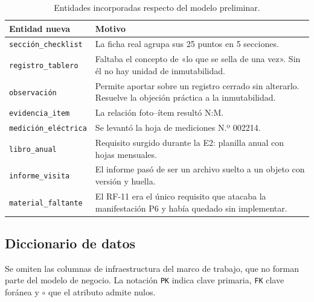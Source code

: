 \documentclass[10pt,letterpaper]{article}
\begin{document}
\begin{table}[H]
\centering
\small
\begin{tabular}{@{}p{3.6cm}p{11.4cm}@{}}
\toprule
\textbf{Entidad nueva} & \textbf{Motivo} \\
\midrule
\texttt{sección\_checklist} & La ficha real agrupa sus 25 puntos en 5 secciones. \\
\texttt{registro\_tablero} & Faltaba el concepto de «lo que se sella de una vez». Sin él no hay unidad de inmutabilidad. \\
\texttt{observación} & Permite aportar sobre un registro cerrado sin alterarlo. Resuelve la objeción práctica a la inmutabilidad. \\
\texttt{evidencia\_item} & La relación foto--ítem resultó N:M. \\
\texttt{medición\_eléctrica} & Se levantó la hoja de mediciones N.º 002214. \\
\texttt{libro\_anual} & Requisito surgido durante la E2: planilla anual con hojas mensuales. \\
\texttt{informe\_visita} & El informe pasó de ser un archivo suelto a un objeto con versión y huella. \\
\texttt{material\_faltante} & El RF-11 era el único requisito que atacaba la manifestación P6 y había quedado sin implementar. \\
\bottomrule
\end{tabular}
\caption{Entidades incorporadas respecto del modelo preliminar.}
\end{table}

\subsection{Diccionario de datos}

Se omiten las columnas de infraestructura del marco de trabajo, que no forman
parte del modelo de negocio. La notación \texttt{PK} indica clave primaria,
\texttt{FK} clave foránea y $\circ$ que el atributo admite nulos.
\end{document}
